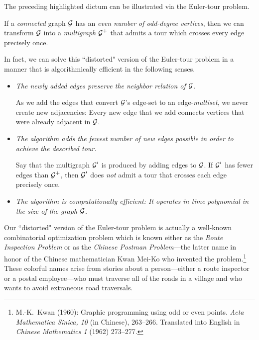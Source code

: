 \medskip

The preceding highlighted dictum can be illustrated via the Euler-tour problem.

\begin{prop}
If a {\em connected} graph $\mbox{$\cal G$}$ has an {\em even number of odd-degree vertices}, then we can transform $\mbox{$\cal G$}$ into a {\em multigraph} $\mbox{$\cal G$}^+$ that admits a tour which crosses every edge precisely once.
\end{prop}

In fact, we can solve this ``distorted" version of the Euler-tour problem in a manner that is algorithmically efficient in the following senses.
\begin{itemize}
\item
{\em The newly added edges preserve the neighbor relation of $\mbox{$\cal G$}$.}

\smallskip

As we add the edges that convert $\mbox{$\cal G$}$'s edge-set to an edge-{\em multiset}, we never create new adjacencies: Every new edge that we add connects vertices that were already adjacent in $\mbox{$\cal G$}$.

\medskip\item
{\em The algorithm adds the fewest number of new edges possible in order to achieve the described tour.}

\smallskip

Say that the multigraph $\mbox{$\cal G$}'$ is produced by adding edges to $\mbox{$\cal G$}$.  If $\mbox{$\cal G$}'$ has fewer edges than $\mbox{$\cal G$}^+$, then $\mbox{$\cal G$}'$ does {\em not} admit a tour that crosses each edge precisely once.

\medskip\item
{\em The algorithm is computationally efficient: It operates in time polynomial in the size of the graph $\mbox{$\cal G$}$.}
\end{itemize}

\medskip

  

Our ``distorted" version of the Euler-tour problem is actually a well-known combinatorial optimization problem which is known either as the {\it Route Inspection Problem} or as the {\it Chinese Postman Problem}---the latter name in honor of the Chinese mathematician Kwan Mei-Ko who invented the problem.\footnote{M.-K.~Kwan (1960): Graphic programming using odd or even points.  {\it Acta Mathematica Sinica, 10} (in Chinese), 263--266.  Translated into English in {\it Chinese Mathematics 1} (1962) 273--277.}  These colorful names arise from stories about a person---either a route inspector or a postal employee---who must traverse all of the roads in a village and who wants to avoid extraneous road traversals.

